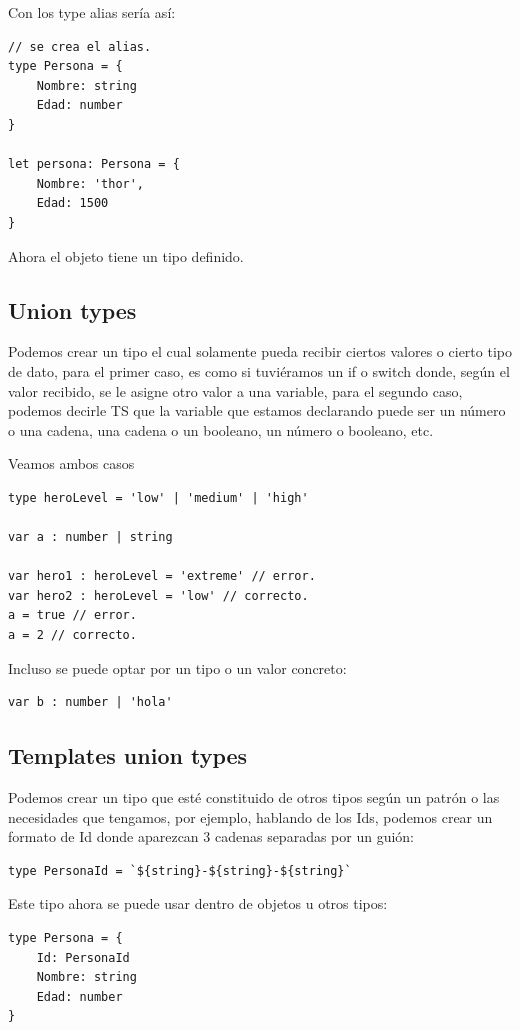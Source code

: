 Con los type alias sería así:
\begin{lstlisting}
// se crea el alias.
type Persona = {
    Nombre: string
    Edad: number
}

let persona: Persona = {
    Nombre: 'thor',
    Edad: 1500
}
\end{lstlisting}

Ahora el objeto tiene un tipo definido.


\subsection{Union types}

Podemos crear un tipo el cual solamente pueda recibir ciertos valores o cierto tipo de dato, para el primer caso, es como si tuviéramos un if o switch donde, según el valor recibido, se le asigne otro valor a una variable, para el segundo caso, podemos decirle TS que la variable que estamos declarando puede ser un número o una cadena, una cadena o un booleano, un número o booleano, etc.

Veamos ambos casos
\begin{lstlisting}
type heroLevel = 'low' | 'medium' | 'high'

var a : number | string

var hero1 : heroLevel = 'extreme' // error.
var hero2 : heroLevel = 'low' // correcto.
a = true // error.
a = 2 // correcto.
\end{lstlisting}

Incluso se puede optar por un tipo o un valor concreto:
\begin{lstlisting}
var b : number | 'hola'
\end{lstlisting}


\subsection{Templates union types}

Podemos crear un tipo que esté constituido de otros tipos según un patrón o las necesidades que tengamos, por ejemplo, hablando de los Ids, podemos crear un formato de Id donde aparezcan 3 cadenas separadas por un guión:
\begin{lstlisting}
type PersonaId = `${string}-${string}-${string}`
\end{lstlisting}

Este tipo ahora se puede usar dentro de objetos u otros tipos:
\begin{lstlisting}
type Persona = {
    Id: PersonaId
    Nombre: string
    Edad: number
}
\end{lstlisting}



